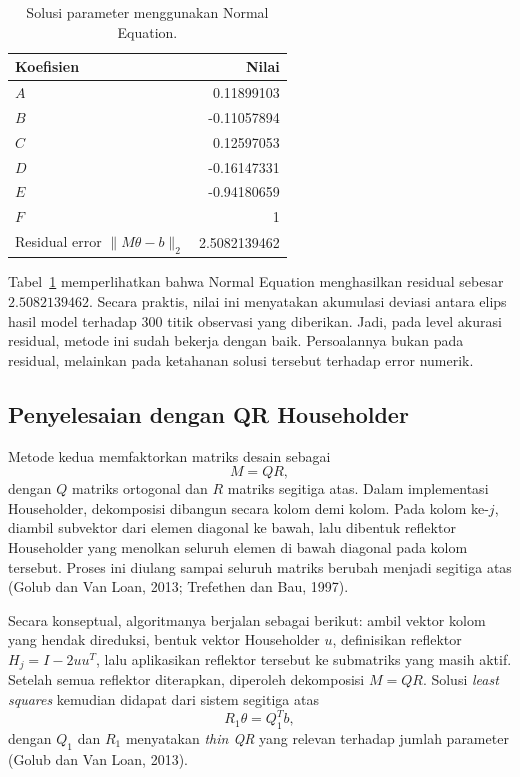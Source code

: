 \documentclass[12pt,a4paper]{article}
\begin{document}
\begin{table}[h]
\centering
\caption{Solusi parameter menggunakan Normal Equation.}
\label{tab:star-normal-solution}
\begin{tabular}{lr}
\toprule
Koefisien & Nilai \\
\midrule
$A$ & 0.11899103 \\
$B$ & -0.11057894 \\
$C$ & 0.12597053 \\
$D$ & -0.16147331 \\
$E$ & -0.94180659 \\
$F$ & 1 \\
\midrule
Residual error $\|M\theta-b\|_2$ & 2.5082139462 \\
\bottomrule
\end{tabular}
\end{table}

Tabel~\ref{tab:star-normal-solution} memperlihatkan bahwa Normal Equation menghasilkan residual sebesar \(2.5082139462\). Secara praktis, nilai ini menyatakan akumulasi deviasi antara elips hasil model terhadap 300 titik observasi yang diberikan. Jadi, pada level akurasi residual, metode ini sudah bekerja dengan baik. Persoalannya bukan pada residual, melainkan pada ketahanan solusi tersebut terhadap error numerik.

\subsection{Penyelesaian dengan QR Householder}
Metode kedua memfaktorkan matriks desain sebagai
\[
M = QR,
\]
dengan \(Q\) matriks ortogonal dan \(R\) matriks segitiga atas. Dalam implementasi Householder, dekomposisi dibangun secara kolom demi kolom. Pada kolom ke-\(j\), diambil subvektor dari elemen diagonal ke bawah, lalu dibentuk reflektor Householder yang menolkan seluruh elemen di bawah diagonal pada kolom tersebut. Proses ini diulang sampai seluruh matriks berubah menjadi segitiga atas (Golub dan Van Loan, 2013; Trefethen dan Bau, 1997).

Secara konseptual, algoritmanya berjalan sebagai berikut: ambil vektor kolom yang hendak direduksi, bentuk vektor Householder \(u\), definisikan reflektor \(H_j = I - 2uu^T\), lalu aplikasikan reflektor tersebut ke submatriks yang masih aktif. Setelah semua reflektor diterapkan, diperoleh dekomposisi \(M=QR\). Solusi \emph{least squares} kemudian didapat dari sistem segitiga atas
\[
R_1\theta = Q_1^Tb,
\]
dengan \(Q_1\) dan \(R_1\) menyatakan \emph{thin QR} yang relevan terhadap jumlah parameter (Golub dan Van Loan, 2013).
\end{document}
